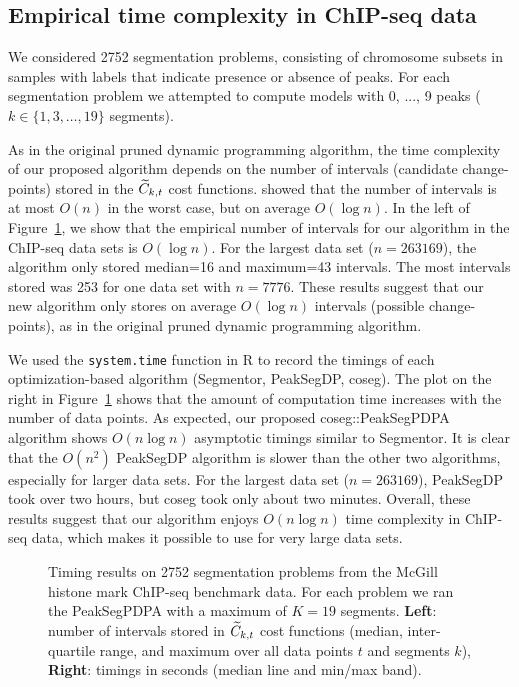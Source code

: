 \documentclass{article}
\begin{document}
\subsection{Empirical time complexity in ChIP-seq data}

We considered 2752 segmentation problems, consisting of chromosome
subsets in samples with labels that indicate presence or absence of
peaks. For each segmentation problem we attempted to compute models
with 0, ..., 9 peaks ($k\in\{1,3,\dots,19\}$ segments).

As in the original pruned dynamic programming algorithm, the time
complexity of our proposed algorithm depends on the number of
intervals (candidate change-points) stored in the $\widetilde{C}_{k,t}$ cost
functions. \citet{pruned-dp} showed that the number of intervals is at
most $O(n)$ in the worst case, but on average $O(\log n)$. In the left
of Figure~\ref{fig:timings}, we show that the empirical number of
intervals for our algorithm in the ChIP-seq data sets is $O(\log
n)$. For the largest data set ($n=263169$), the algorithm only stored
median=16 and maximum=43 intervals. The most intervals stored was 253
for one data set with $n=7776$. These results suggest that our new
algorithm only stores on average $O(\log n)$ intervals (possible
change-points), as in the original pruned dynamic programming
algorithm.

We used the \verb|system.time| function in R to record the timings of
each optimization-based algorithm (Segmentor, PeakSegDP, coseg). The
plot on the right in Figure~\ref{fig:timings} shows that the amount of
computation time increases with the number of data points. As
expected, our proposed coseg::PeakSegPDPA algorithm shows $O(n\log n)$
asymptotic timings similar to Segmentor. It is clear that the $O(n^2)$
PeakSegDP algorithm is slower than the other two algorithms,
especially for larger data sets. For the largest data set
($n=263169$), PeakSegDP took over two hours, but coseg took only about
two minutes. Overall, these results suggest that our algorithm enjoys
$O(n\log n)$ time complexity in ChIP-seq data, which makes it possible
to use for very large data sets.

\begin{figure}[b!]
  \centering
  \parbox{0.49\textwidth}{
  }
  \parbox{0.49\textwidth}{
  }
  \vskip -0.5cm
  \caption{Timing results on 2752 segmentation problems from the
    McGill histone mark ChIP-seq benchmark data. For each problem we
    ran the PeakSegPDPA with a maximum of $K=19$ segments.
    \textbf{Left}: number of intervals stored in $\widetilde{C}_{k,t}$ cost
    functions (median, inter-quartile range, and maximum over all data
    points $t$ and segments $k$), \textbf{Right}: timings in seconds
    (median line and min/max band).}
  \label{fig:timings}
\end{figure}
\end{document}
